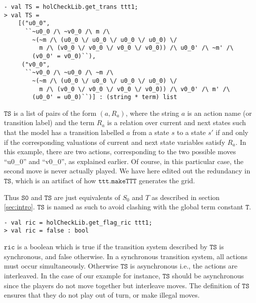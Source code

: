 \documentclass[12pt,fleqn]{article}
\begin{document}
\begin{session}\begin{verbatim}
- val TS = holCheckLib.get_trans ttt1;
> val TS =
    [("u0_0",
      ``~u0_0 /\ ~v0_0 /\ m /\
        ~(~m /\ (u0_0 \/ u0_0 \/ u0_0 \/ u0_0) \/
          m /\ (v0_0 \/ v0_0 \/ v0_0 \/ v0_0)) /\ u0_0' /\ ~m' /\
        (v0_0' = v0_0)``),
     ("v0_0",
      ``~v0_0 /\ ~u0_0 /\ ~m /\
        ~(~m /\ (u0_0 \/ u0_0 \/ u0_0 \/ u0_0) \/
          m /\ (v0_0 \/ v0_0 \/ v0_0 \/ v0_0)) /\ v0_0' /\ m' /\
        (u0_0' = u0_0)``)] : (string * term) list
\end{verbatim}\end{session}
\(\mathtt{TS}\) is a list of pairs of the form \( (a,R_a)\), where the string \(a\) is an action name (or transition label) and the \HOL{} term \(R_a\) is a relation over current and next states such that the model has a transition labelled \(a\) from a state \( s \) to a state \(s'\) if and only if the corresponding valuations of current and next state variables satisfy \( R_a \). In this example, there are two actions, corresponding to the two possible moves ``u0\_0'' and ``v0\_0'', as explained earlier. Of course, in this particular case, the second move is never actually played. We have here edited out the redundancy in \(\mathtt{TS}\), which is an artifact of how \(\mathtt{ttt.makeTTT}\) generates the grid.

Thus \(\mathtt{S0}\) and \(\mathtt{TS}\) are just \HOL{} equivalents of \(S_0\) and \(T\) as described in section \ref{sec:intro}. \( \mathtt{TS} \) is named as such to avoid clashing with the global \HOL{} term constant \( \mathtt{T} \).

\begin{session}\begin{verbatim}
- val ric = holCheckLib.get_flag_ric ttt1;
> val ric = false : bool
\end{verbatim}\end{session}
\(\mathtt{ric}\) is a boolean which is true if the transition system described by \(\mathtt{TS}\) is synchronous, and false otherwise. In a synchronous transition system, all actions must occur simultaneously. Otherwise \(\mathtt{TS}\) is asynchronous i.e., the actions are interleaved. In the case of our example for instance, \( \mathtt{TS} \) should be asynchronous since the players do not move together but interleave moves. The definition of \( \mathtt{TS} \) ensures that they do not play out of turn, or make illegal moves.
\end{document}
